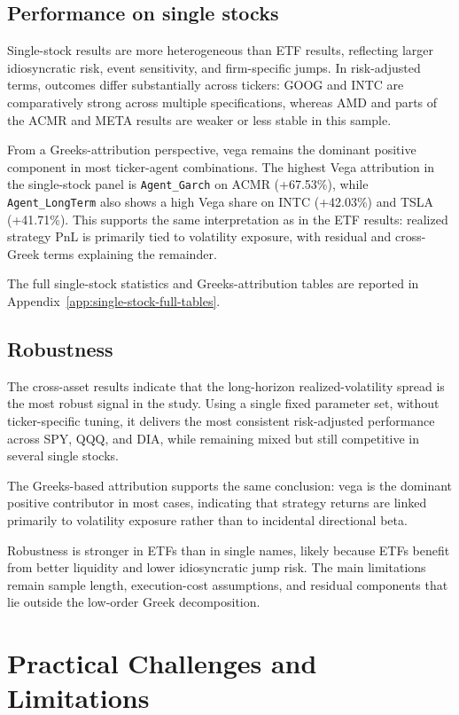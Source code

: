﻿\documentclass{article}
\begin{document}
\subsection{Performance on single stocks}

Single-stock results are more heterogeneous than ETF results, reflecting larger idiosyncratic risk, event sensitivity, and firm-specific jumps. In risk-adjusted terms, outcomes differ substantially across tickers: GOOG and INTC are comparatively strong across multiple specifications, whereas AMD and parts of the ACMR and META results are weaker or less stable in this sample.

From a Greeks-attribution perspective, vega remains the dominant positive component in most ticker-agent combinations. The highest Vega attribution in the single-stock panel is \texttt{Agent\_Garch} on ACMR (+67.53\%), while \texttt{Agent\_LongTerm} also shows a high Vega share on INTC (+42.03\%) and TSLA (+41.71\%). This supports the same interpretation as in the ETF results: realized strategy PnL is primarily tied to volatility exposure, with residual and cross-Greek terms explaining the remainder.

The full single-stock statistics and Greeks-attribution tables are reported in Appendix~\ref{app:single-stock-full-tables}.

\subsection{Robustness}
The cross-asset results indicate that the long-horizon realized-volatility spread is the most robust signal in the study. Using a single fixed parameter set, without ticker-specific tuning, it delivers the most consistent risk-adjusted performance across SPY, QQQ, and DIA, while remaining mixed but still competitive in several single stocks.

The Greeks-based attribution supports the same conclusion: vega is the dominant positive contributor in most cases, indicating that strategy returns are linked primarily to volatility exposure rather than to incidental directional beta.

Robustness is stronger in ETFs than in single names, likely because ETFs benefit from better liquidity and lower idiosyncratic jump risk. The main limitations remain sample length, execution-cost assumptions, and residual components that lie outside the low-order Greek decomposition.



\section{Practical Challenges and Limitations}
\end{document}
